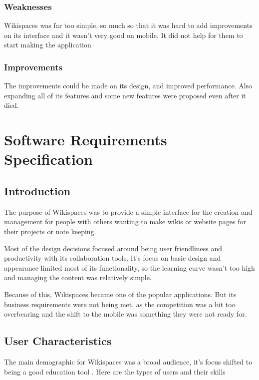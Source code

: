 \documentclass{article}
\begin{document}
\subsubsection{Weaknesses}
Wikispaces was far too simple, so much so that it was hard to add improvements on its interface and it wasn't very good on mobile. It did not help for them to start making the application

\subsubsection{Improvements}
The improvements could be made on its design, and improved performance. Also expanding all of its features and some new features were proposed even after it died. \cite{CreateWikiWithWordPress}

\section{Software Requirements Specification}

\subsection{Introduction}

The purpose of Wikispaces was to provide a simple interface for the creation and management for people with others wanting to make wikis or website pages for their projects or note keeping. \newline

Most of the design decisions focused around being user friendliness and productivity with its collaboration tools. It's focus on basic design and appearance limited most of its functionality, so the learning curve wasn't too high and managing the content was relatively simple. \newline

Because of this, Wikispaces became one of the popular applications. But its business requirements were not being met, as the competition was a bit too overbearing and the shift to the mobile was something they were not ready for.

\subsection{User Characteristics}

The main demographic for Wikispaces was a broad audience, it's focus shifted to being a good education tool \cite{WikispacesClosedDown}. Here are the types of users and their skills
\end{document}
